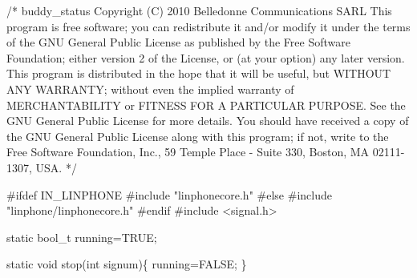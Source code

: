 \begin{DoxyCodeInclude}

\textcolor{comment}{/*}
\textcolor{comment}{buddy\_status}
\textcolor{comment}{Copyright (C) 2010  Belledonne Communications SARL }
\textcolor{comment}{}
\textcolor{comment}{This program is free software; you can redistribute it and/or}
\textcolor{comment}{modify it under the terms of the GNU General Public License}
\textcolor{comment}{as published by the Free Software Foundation; either version 2}
\textcolor{comment}{of the License, or (at your option) any later version.}
\textcolor{comment}{}
\textcolor{comment}{This program is distributed in the hope that it will be useful,}
\textcolor{comment}{but WITHOUT ANY WARRANTY; without even the implied warranty of}
\textcolor{comment}{MERCHANTABILITY or FITNESS FOR A PARTICULAR PURPOSE.  See the}
\textcolor{comment}{GNU General Public License for more details.}
\textcolor{comment}{}
\textcolor{comment}{You should have received a copy of the GNU General Public License}
\textcolor{comment}{along with this program; if not, write to the Free Software}
\textcolor{comment}{Foundation, Inc., 59 Temple Place - Suite 330, Boston, MA  02111-1307, USA.}
\textcolor{comment}{*/}

\textcolor{preprocessor}{#ifdef IN\_LINPHONE}
\textcolor{preprocessor}{}\textcolor{preprocessor}{#include "linphonecore.h"}
\textcolor{preprocessor}{#else}
\textcolor{preprocessor}{}\textcolor{preprocessor}{#include "linphone/linphonecore.h"}
\textcolor{preprocessor}{#endif}
\textcolor{preprocessor}{}
\textcolor{preprocessor}{#include <signal.h>}

\textcolor{keyword}{static} bool\_t running=TRUE;

\textcolor{keyword}{static} \textcolor{keywordtype}{void} stop(\textcolor{keywordtype}{int} signum)\{
        running=FALSE;
\}


\end{DoxyCodeInclude}
